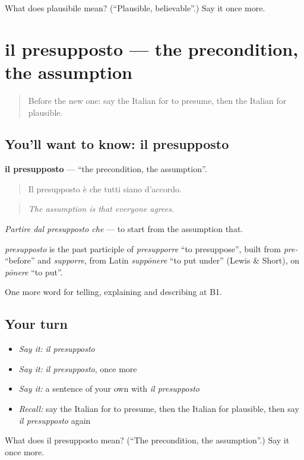 \begin{tcolorbox}[breakable,colback=teal!4,colframe=teal!35!black,title={Before you move on}]
What does plausibile mean? (\textquotedblleft{}Plausible, believable\textquotedblright{}.) Say it once more.
\end{tcolorbox}
\section[il presupposto]{il presupposto — the precondition, the assumption}

\label{lesson:IT-C372-presupposto}



\begin{quote}
Before the new one: say the Italian for to presume, then the Italian for plausible.
\end{quote}

\subsection*{You'll want to know: il presupposto}
\textbf{il presupposto} — \textquotedblleft{}the precondition, the assumption\textquotedblright{}.

\begin{quote}
Il presupposto è che tutti siano d'accordo.
\end{quote}

\begin{quote}
\emph{The assumption is that everyone agrees.}
\end{quote}

\emph{Partire dal presupposto che} — to start from the assumption that.

\begin{cousinweb}
\emph{presupposto} is the past participle of \emph{presupporre} \textquotedblleft{}to presuppose\textquotedblright{}, built from \emph{pre-} \textquotedblleft{}before\textquotedblright{} and \emph{supporre}, from Latin \emph{suppōnere} \textquotedblleft{}to put under\textquotedblright{} (Lewis \& Short), on \emph{pōnere} \textquotedblleft{}to put\textquotedblright{}.
\end{cousinweb}

\begin{grammarlens}[title={What you've built}]
One more word for telling, explaining and describing at B1.
\end{grammarlens}

\subsection*{Your turn}
\begin{itemize}
\raggedright
  \item \emph{Say it:} \emph{il presupposto}
  \item \emph{Say it:} \emph{il presupposto}, once more
  \item \emph{Say it:} a sentence of your own with \emph{il presupposto}
  \item \emph{Recall:} say the Italian for to presume, then the Italian for plausible, then say \emph{il presupposto} again
\end{itemize}

\begin{tcolorbox}[breakable,colback=teal!4,colframe=teal!35!black,title={Before you move on}]
What does il presupposto mean? (\textquotedblleft{}The precondition, the assumption\textquotedblright{}.) Say it once more.
\end{tcolorbox}
